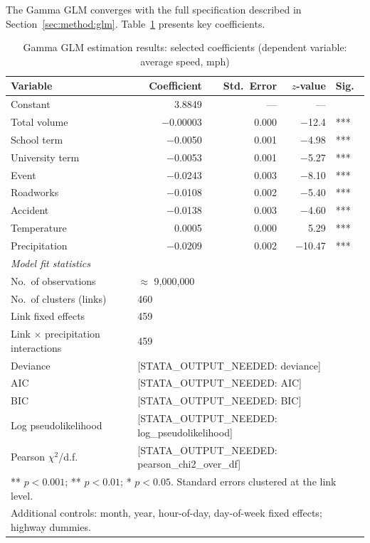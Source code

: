 \documentclass[review]{elsarticle}
\begin{document}
The Gamma GLM converges with the full specification described in Section~\ref{sec:method:glm}. Table~\ref{tab:glm} presents key coefficients.

\begin{table}[htbp]
\centering
\caption{Gamma GLM estimation results: selected coefficients (dependent variable: average speed, mph)}
\label{tab:glm}
\begin{tabular}{lrrrl}
\toprule
Variable & Coefficient & Std.\ Error & $z$-value & Sig. \\
\midrule
Constant & 3.8849 & --- & --- & \\
Total volume & $-$0.00003 & 0.000 & $-$12.4 & *** \\
School term & $-$0.0050 & 0.001 & $-$4.98 & *** \\
University term & $-$0.0053 & 0.001 & $-$5.27 & *** \\
Event & $-$0.0243 & 0.003 & $-$8.10 & *** \\
Roadworks & $-$0.0108 & 0.002 & $-$5.40 & *** \\
Accident & $-$0.0138 & 0.003 & $-$4.60 & *** \\
Temperature & 0.0005 & 0.000 & 5.29 & *** \\
Precipitation & $-$0.0209 & 0.002 & $-$10.47 & *** \\
\midrule
\multicolumn{5}{l}{\textit{Model fit statistics}} \\
No.\ of observations & \multicolumn{4}{l}{$\approx$ 9{,}000{,}000} \\
No.\ of clusters (links) & \multicolumn{4}{l}{460} \\
Link fixed effects & \multicolumn{4}{l}{459} \\
Link $\times$ precipitation interactions & \multicolumn{4}{l}{459} \\
Deviance & \multicolumn{4}{l}{[STATA\_OUTPUT\_NEEDED: deviance]} \\
AIC & \multicolumn{4}{l}{[STATA\_OUTPUT\_NEEDED: AIC]} \\
BIC & \multicolumn{4}{l}{[STATA\_OUTPUT\_NEEDED: BIC]} \\
Log pseudolikelihood & \multicolumn{4}{l}{[STATA\_OUTPUT\_NEEDED: log\_pseudolikelihood]} \\
Pearson $\chi^2$/d.f. & \multicolumn{4}{l}{[STATA\_OUTPUT\_NEEDED: pearson\_chi2\_over\_df]} \\
\bottomrule
\multicolumn{5}{l}{\footnotesize *** $p < 0.001$; ** $p < 0.01$; * $p < 0.05$. Standard errors clustered at the link level.} \\
\multicolumn{5}{l}{\footnotesize Additional controls: month, year, hour-of-day, day-of-week fixed effects; highway dummies.} \\
\end{tabular}
\end{table}
\end{document}
